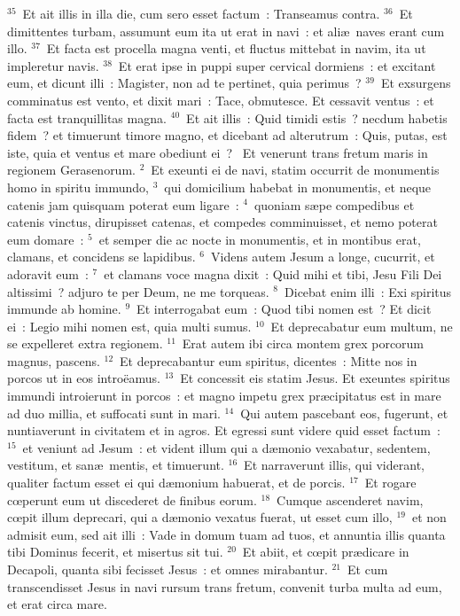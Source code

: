 ${}^{35}$~Et ait illis in illa die, cum sero esset factum~: Transeamus contra.
${}^{36}$~Et dimittentes turbam, assumunt eum ita ut erat in navi~: et ali\ae\ naves erant cum illo.
${}^{37}$~Et facta est procella magna venti, et fluctus mittebat in navim, ita ut impleretur navis.
${}^{38}$~Et erat ipse in puppi super cervical dormiens~: et excitant eum, et dicunt illi~: Magister, non ad te pertinet, quia perimus~?
${}^{39}$~Et exsurgens comminatus est vento, et dixit mari~: Tace, obmutesce. Et cessavit ventus~: et facta est tranquillitas magna.
${}^{40}$~Et ait illis~: Quid timidi estis~? necdum habetis fidem~? et timuerunt timore magno, et dicebant ad alterutrum~: Quis, putas, est iste, quia et ventus et mare obediunt ei~?
~Et venerunt trans fretum maris in regionem Gerasenorum.
${}^{2}$~Et exeunti ei de navi, statim occurrit de monumentis homo in spiritu immundo,
${}^{3}$~qui domicilium habebat in monumentis, et neque catenis jam quisquam poterat eum ligare~:
${}^{4}$~quoniam s\ae pe compedibus et catenis vinctus, dirupisset catenas, et compedes comminuisset, et nemo poterat eum domare~:
${}^{5}$~et semper die ac nocte in monumentis, et in montibus erat, clamans, et concidens se lapidibus.
${}^{6}$~Videns autem Jesum a longe, cucurrit, et adoravit eum~:
${}^{7}$~et clamans voce magna dixit~: Quid mihi et tibi, Jesu Fili Dei altissimi~? adjuro te per Deum, ne me torqueas.
${}^{8}$~Dicebat enim illi~: Exi spiritus immunde ab homine.
${}^{9}$~Et interrogabat eum~: Quod tibi nomen est~? Et dicit ei~: Legio mihi nomen est, quia multi sumus.
${}^{10}$~Et deprecabatur eum multum, ne se expelleret extra regionem.
${}^{11}$~Erat autem ibi circa montem grex porcorum magnus, pascens.
${}^{12}$~Et deprecabantur eum spiritus, dicentes~: Mitte nos in porcos ut in eos intro\"eamus.
${}^{13}$~Et concessit eis statim Jesus. Et exeuntes spiritus immundi introierunt in porcos~: et magno impetu grex pr\ae cipitatus est in mare ad duo millia, et suffocati sunt in mari.
${}^{14}$~Qui autem pascebant eos, fugerunt, et nuntiaverunt in civitatem et in agros. Et egressi sunt videre quid esset factum~:
${}^{15}$~et veniunt ad Jesum~: et vident illum qui a d\ae monio vexabatur, sedentem, vestitum, et san\ae\ mentis, et timuerunt.
${}^{16}$~Et narraverunt illis, qui viderant, qualiter factum esset ei qui d\ae monium habuerat, et de porcis.
${}^{17}$~Et rogare cœperunt eum ut discederet de finibus eorum.
${}^{18}$~Cumque ascenderet navim, cœpit illum deprecari, qui a d\ae monio vexatus fuerat, ut esset cum illo,
${}^{19}$~et non admisit eum, sed ait illi~: Vade in domum tuam ad tuos, et annuntia illis quanta tibi Dominus fecerit, et misertus sit tui.
${}^{20}$~Et abiit, et cœpit pr\ae dicare in Decapoli, quanta sibi fecisset Jesus~: et omnes mirabantur.
${}^{21}$~Et cum transcendisset Jesus in navi rursum trans fretum, convenit turba multa ad eum, et erat circa mare.


